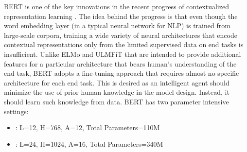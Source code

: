 BERT is one of the key innovations in the recent progress of contextualized representation learning \cite{peters2018deep,howard2018universal,radford2018improving,devlin2018bert}.
The idea behind the progress is that even though the word embedding layer (in a typical neural network for NLP) is trained from large-scale corpora, training a wide variety of neural architectures that encode contextual representations only from the limited supervised data on end tasks is insufficient.
Unlike ELMo \cite{peters2018deep} and ULMFiT \cite{howard2018universal} that are intended to provide additional features for a particular architecture that bears human's understanding of the end task, BERT adopts a fine-tuning approach that requires almost no specific architecture for each end task. This is desired as an intelligent agent should minimize the use of prior human knowledge in the model design. Instead, it should learn such knowledge from data. BERT has two parameter intensive settings: 


\begin{itemize}
    \item {\bf \bertbase}: L=12, H=768, A=12, Total Parameters=110M
    \item {\bf \bertlarge}: L=24, H=1024, A=16, Total Parameters=340M
\end{itemize}